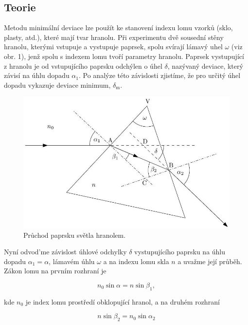 \documentclass[czech,11pt,a4paper]{article}
\begin{document}
	\begin{multicols}{2}
		\section{Teorie}

Metodu minimální deviace lze použít ke stanovení indexu lomu vzorků (sklo, plasty, atd.), které mají tvar hranolu. Při experimentu dvě sousední stěny hranolu, kterými vstupuje a vystupuje paprsek, spolu svírají lámavý uhel $\omega$ (viz obr. 1), jenž spolu s indexem lomu tvoří parametry hranolu. Paprsek vystupující z hranolu je od vstupujícího paprsku odchýlen o úhel $\delta$, nazývaný deviace, který závisí na úhlu dopadu $\alpha_{1}$. Po analýze této závislosti zjistíme, že pro určitý úhel dopadu vykazuje deviace minimum, $\delta_{\mathrm{m}}$.\\
\begin{figure}[H]
	\includegraphics[max width=0.95\linewidth, center]{2024_12_03_db7ee7d12aab7219c185g-1}
	\caption{Průchod paprsku světla hranolem.}
\end{figure}


Nyní odvod’me závislost úhlové odchylky $\delta$ vystupujícího paprsku na úhlu dopadu $\alpha_{1}=\alpha$, lámavém úhlu $\omega$ a na indexu lomu skla $n$ a uvažme její průběh. Zákon lomu na prvním rozhraní je

\begin{equation}
	n_{0} \sin \alpha=n \sin \beta_{1},
\end{equation}


kde $n_{0}$ je index lomu prostředí obklopující hranol, a na druhém rozhraní

\begin{equation}
	n \sin \beta_{2}=n_{0} \sin \alpha_{2}
\end{equation}



\end{multicols}
\end{document}

